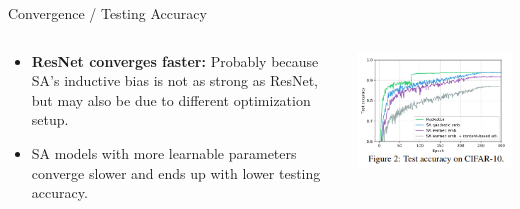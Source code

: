 \documentclass[9pt]{beamer}
\begin{document}
\begin{frame}{Convergence / Testing Accuracy}
\begin{columns}
\begin{column}{0.43\textwidth}
  \begin{itemize}
    \item \textbf{ResNet converges faster:} Probably because SA's inductive bias is not as strong as ResNet, but may also be due to different optimization setup.
    
    \vspace{.1in}
    \item SA models with more learnable parameters converge slower and ends up with lower testing accuracy.  
  \end{itemize}
\end{column}
\begin{column}{0.55\textwidth} \centering
  \includegraphics[width=\textwidth]{presentation/images/converge_test_acc.png}
\end{column}
\end{columns}
\end{frame}
\end{document}
